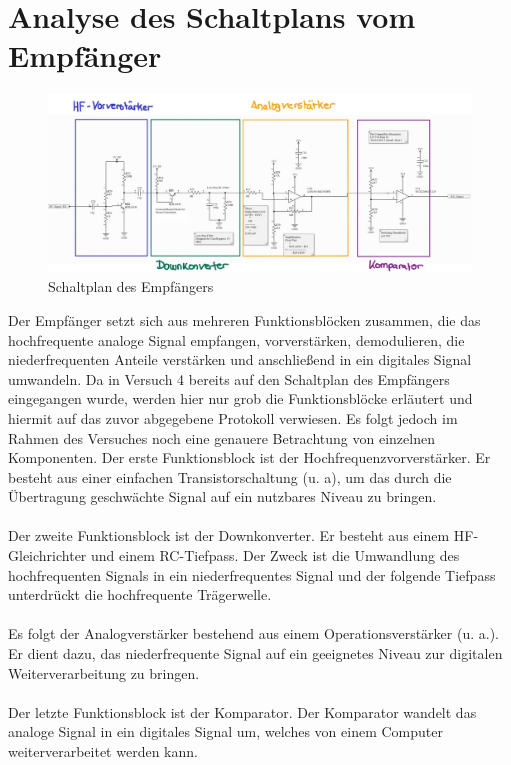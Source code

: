 \section{Analyse des Schaltplans vom Empfänger} %
\begin{figure}[H]
    \centering
    \includegraphics[width=1\textwidth]{Pictures/Schaltbild.jpg}
    \caption{Schaltplan des Empfängers}
    \label{fig:opamp_schaltung}
\end{figure}
Der Empfänger setzt sich aus mehreren Funktionsblöcken zusammen, die das hochfrequente analoge Signal empfangen, vorverstärken,
demodulieren, die niederfrequenten Anteile verstärken und anschließend in ein digitales Signal umwandeln. Da in Versuch 4 bereits auf den
Schaltplan des Empfängers eingegangen wurde, werden hier nur grob die Funktionsblöcke erläutert und hiermit auf das zuvor abgegebene Protokoll verwiesen.
Es folgt jedoch im Rahmen des Versuches noch eine genauere Betrachtung von einzelnen Komponenten. 
\clearpage
Der erste Funktionsblock ist der Hochfrequenzvorverstärker. Er besteht aus einer einfachen Transistorschaltung (u. a), um das durch die Übertragung
geschwächte Signal auf ein nutzbares Niveau zu bringen. \\\\
Der zweite Funktionsblock ist der Downkonverter. Er besteht aus einem HF-Gleichrichter und einem RC-Tiefpass. Der Zweck ist
die Umwandlung des hochfrequenten Signals in ein niederfrequentes Signal und der folgende Tiefpass unterdrückt die hochfrequente Trägerwelle.
\\\\
Es folgt der Analogverstärker bestehend aus einem Operationsverstärker (u. a.). Er dient dazu, das niederfrequente Signal
auf ein geeignetes Niveau zur digitalen Weiterverarbeitung zu bringen.\\ \\
Der letzte Funktionsblock ist der Komparator. 
Der Komparator wandelt das analoge Signal in ein digitales Signal um, welches von einem Computer weiterverarbeitet werden kann. 




